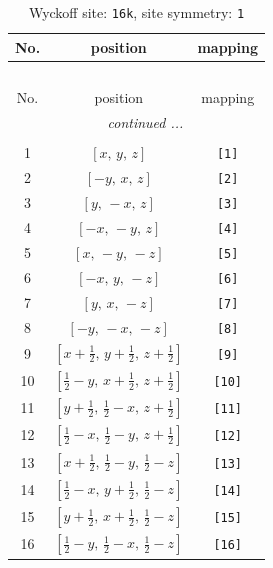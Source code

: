 \documentclass[fleqn,8pt]{jsarticle}
\begin{document}
\begin{longtable}{ccc}
\caption{Wyckoff site: {\tt 16k}, site symmetry: {\tt 1}}
 \\
 \hline \hline
No. & position & mapping \\ \hline \endfirsthead

\multicolumn{2}{l}{\tablename\ \thetable{}} \\
 \hline \hline
No. & position & mapping \\ \hline \endhead

 \hline \hline
\multicolumn{2}{r}{\footnotesize\it continued ...} \\ \endfoot

 \hline \hline
\multicolumn{2}{r}{} \\ \endlastfoot

1 & $\left[ x,\, y,\, z \right]$ & {\tt [1]} \\ \hline
2 & $\left[ - y,\, x,\, z \right]$ & {\tt [2]} \\ \hline
3 & $\left[ y,\, - x,\, z \right]$ & {\tt [3]} \\ \hline
4 & $\left[ - x,\, - y,\, z \right]$ & {\tt [4]} \\ \hline
5 & $\left[ x,\, - y,\, - z \right]$ & {\tt [5]} \\ \hline
6 & $\left[ - x,\, y,\, - z \right]$ & {\tt [6]} \\ \hline
7 & $\left[ y,\, x,\, - z \right]$ & {\tt [7]} \\ \hline
8 & $\left[ - y,\, - x,\, - z \right]$ & {\tt [8]} \\ \hline
9 & $\left[ x + \frac{1}{2},\, y + \frac{1}{2},\, z + \frac{1}{2} \right]$ & {\tt [9]} \\ \hline
10 & $\left[ \frac{1}{2} - y,\, x + \frac{1}{2},\, z + \frac{1}{2} \right]$ & {\tt [10]} \\ \hline
11 & $\left[ y + \frac{1}{2},\, \frac{1}{2} - x,\, z + \frac{1}{2} \right]$ & {\tt [11]} \\ \hline
12 & $\left[ \frac{1}{2} - x,\, \frac{1}{2} - y,\, z + \frac{1}{2} \right]$ & {\tt [12]} \\ \hline
13 & $\left[ x + \frac{1}{2},\, \frac{1}{2} - y,\, \frac{1}{2} - z \right]$ & {\tt [13]} \\ \hline
14 & $\left[ \frac{1}{2} - x,\, y + \frac{1}{2},\, \frac{1}{2} - z \right]$ & {\tt [14]} \\ \hline
15 & $\left[ y + \frac{1}{2},\, x + \frac{1}{2},\, \frac{1}{2} - z \right]$ & {\tt [15]} \\ \hline
16 & $\left[ \frac{1}{2} - y,\, \frac{1}{2} - x,\, \frac{1}{2} - z \right]$ & {\tt [16]} \\
\end{longtable}
\end{document}
